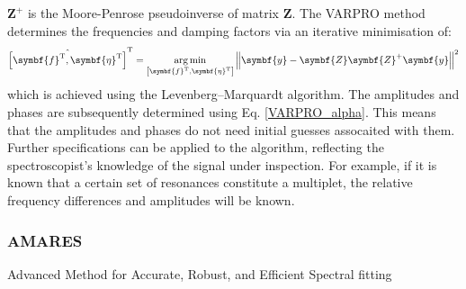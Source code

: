 $\symbf{Z}^+$ is the Moore-Penrose pseudoinverse of matrix $\symbf{Z}$\cite{Penrose1955, Strang2018}. The VARPRO method determines the frequencies and damping factors via an iterative minimisation of:
\begin{equation}
  \hat{\left[\symbf{f}^{\mathrm{T}}, \symbf{\eta}^{\mathrm{T}}\right]}^{\mathrm{T}} = \argmin_{\left[\symbf{f}^{\mathrm{T}}, \symbf{\eta}^{\mathrm{T}}\right]} \left \lVert \symbf{y} - \symbf{Z}\symbf{Z}^+\symbf{y} \right \rVert^2
\end{equation}
which is achieved using the Levenberg–Marquardt algorithm\cite{Levenberg1944, Marquardt1963}. The amplitudes and phases are subsequently determined using Eq. \ref{VARPRO_alpha}. This means that the amplitudes and phases do not need initial guesses assocaited with them. Further specifications can be applied to the algorithm, reflecting the spectroscopist's knowledge of the signal under inspection. For example, if it is known that a certain set of resonances constitute a multiplet, the relative frequency differences and amplitudes will be known.

\subsubsection{AMARES}
Advanced Method for Accurate, Robust, and Efficient Spectral fitting
